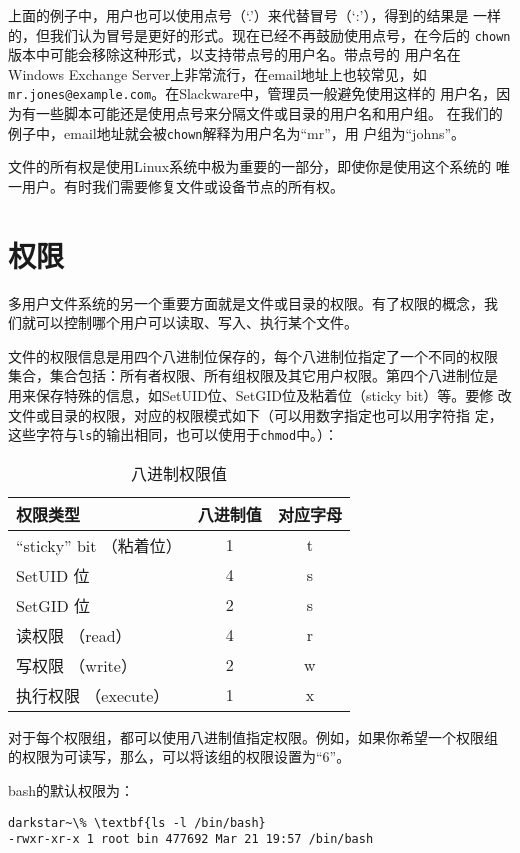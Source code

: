 上面的例子中，用户也可以使用点号（`.'）来代替冒号（`:'），得到的结果是
一样的，但我们认为冒号是更好的形式。现在已经不再鼓励使用点号，在今后的
\texttt{chown}版本中可能会移除这种形式，以支持带点号的用户名。带点号的
用户名在Windows Exchange Server上非常流行，在email地址上也较常见，如
\texttt{mr.jones@example.com}。在Slackware中，管理员一般避免使用这样的
用户名，因为有一些脚本可能还是使用点号来分隔文件或目录的用户名和用户组。
在我们的例子中，email地址就会被\texttt{chown}解释为用户名为``mr''，用
户组为``johns''。

文件的所有权是使用Linux系统中极为重要的一部分，即使你是使用这个系统的
唯一用户。有时我们需要修复文件或设备节点的所有权。

\section{权限}
\label{sec:filesystemStructure:permission}
多用户文件系统的另一个重要方面就是文件或目录的权限。有了权限的概念，我
们就可以控制哪个用户可以读取、写入、执行某个文件。

文件的权限信息是用四个八进制位保存的，每个八进制位指定了一个不同的权限
集合，集合包括：所有者权限、所有组权限及其它用户权限。第四个八进制位是
用来保存特殊的信息，如SetUID位、SetGID位及粘着位（sticky bit）等。要修
改文件或目录的权限，对应的权限模式如下（可以用数字指定也可以用字符指
定，这些字符与\texttt{ls}的输出相同，也可以使用于\texttt{chmod}中。）：

\begin{table}[htpb]
  \centering
  \begin{tabular}{l|c|c}
    \hline\hline 
    权限类型 & 八进制值 & 对应字母 \\ \hline
    ``sticky'' bit （粘着位） & 1 & t \\
    SetUID 位 & 4 & s \\
    SetGID 位 & 2 & s \\
    读权限 （read） & 4 & r \\
    写权限 （write） & 2 & w \\
    执行权限 （execute） & 1 & x \\
    \hline\hline
  \end{tabular}
  \caption{八进制权限值}
  \label{tab:octalPermissionValue}
\end{table}

对于每个权限组，都可以使用八进制值指定权限。例如，如果你希望一个权限组
的权限为可读写，那么，可以将该组的权限设置为``6''。

bash的默认权限为：
\begin{Verbatim}[frame=single, commandchars=\\\{\}]
darkstar~\% \textbf{ls -l /bin/bash}
-rwxr-xr-x 1 root bin 477692 Mar 21 19:57 /bin/bash
\end{Verbatim}

